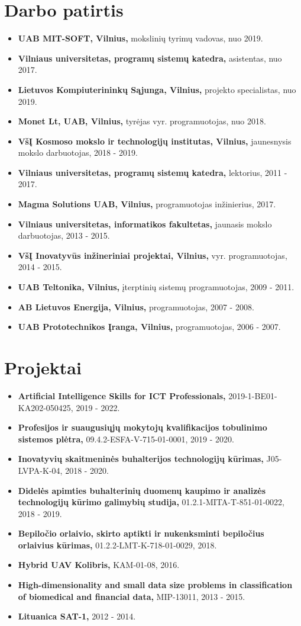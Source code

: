 \documentclass[a4paper,11pt]{article}
\newcommand{\resumeItem}[2]{
  \item\small{
    \textbf{#1}{ #2 \vspace{-2pt}}
  }
}
\newcommand{\resumeSubItem}[2]{\resumeItem{#1}{#2}\vspace{-4pt}}
\newcommand{\resumeSubHeadingListStart}{\begin{itemize}[leftmargin=*] \renewcommand\labelitemi{$\circ$}}
\newcommand{\resumeSubHeadingListEnd}{\end{itemize}}
\begin{document}
\section{Darbo patirtis}
  \resumeSubHeadingListStart
    \resumeSubItem{UAB MIT-SOFT, Vilnius,}{mokslinių tyrimų vadovas, nuo 2019.}
    \resumeSubItem{Vilniaus universitetas, programų sistemų katedra,}{asistentas, nuo 2017.}
    \resumeSubItem{Lietuvos Kompiuterininkų Sąjunga, Vilnius,}{projekto specialistas, nuo 2019.}
    \resumeSubItem{Monet Lt, UAB, Vilnius,}{tyrėjas vyr. programuotojas, nuo 2018.}
    \resumeSubItem{VšĮ Kosmoso mokslo ir technologijų institutas, Vilnius,}{jaunesnysis mokslo darbuotojas, 2018 - 2019.}
    \resumeSubItem{Vilniaus universitetas, programų sistemų katedra,}{lektorius, 2011 - 2017.}
    \resumeSubItem{Magma Solutions UAB, Vilnius,}{programuotojas inžinierius, 2017.}
    \resumeSubItem{Vilniaus universitetas, informatikos fakultetas,}{jaunasis mokslo darbuotojas, 2013 - 2015.}
    \resumeSubItem{VšĮ Inovatyvūs inžineriniai projektai, Vilnius,}{vyr. programuotojas, 2014 - 2015.}
    \resumeSubItem{UAB Teltonika, Vilnius,}{įterptinių sistemų programuotojas, 2009 - 2011.}
    \resumeSubItem{AB Lietuvos Energija, Vilnius,}{programuotojas, 2007 - 2008.}
    \resumeSubItem{UAB Prototechnikos Įranga, Vilnius,}{programuotojas, 2006 - 2007.}
  \resumeSubHeadingListEnd
\vspace{-15pt}
\section{Projektai}
  \resumeSubHeadingListStart
    \resumeSubItem{Artificial Intelligence Skills for ICT Professionals,}{2019-1-BE01-KA202-050425, 2019 - 2022.}
    \resumeSubItem{Profesijos ir suaugusiųjų mokytojų kvalifikacijos tobulinimo sistemos plėtra,}{09.4.2-ESFA-V-715-01-0001, 2019 - 2020.}
    \resumeSubItem{Inovatyvių skaitmeninės buhalterijos technologijų kūrimas,}{J05-LVPA-K-04, 2018 - 2020.}
    \resumeSubItem{Didelės apimties buhalterinių duomenų kaupimo ir analizės technologijų kūrimo galimybių studija,}{01.2.1-MITA-T-851-01-0022, 2018 - 2019.}
    \resumeSubItem{Bepiločio orlaivio, skirto aptikti ir nukenksminti bepiločius orlaivius kūrimas,}{01.2.2-LMT-K-718-01-0029, 2018.}
    \resumeSubItem{Hybrid UAV Kolibris,}{KAM-01-08, 2016.}
    \resumeSubItem{High-dimensionality and small data size problems in classification of biomedical and financial data,}{MIP-13011, 2013 - 2015.}
    \resumeSubItem{Lituanica SAT-1,}{2012 - 2014.}
  \resumeSubHeadingListEnd
\vspace{-15pt}
\end{document}
